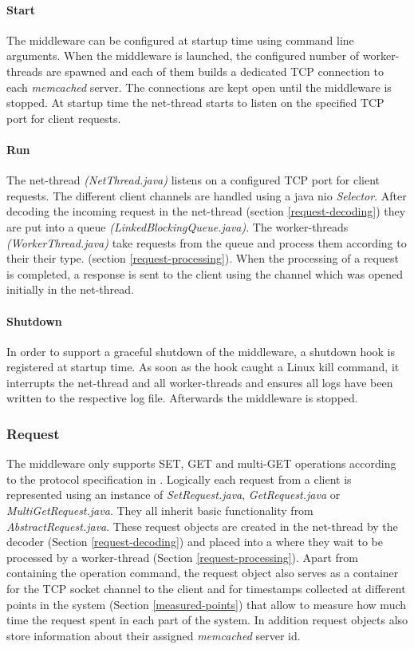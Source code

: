 \documentclass[report.tex]{subfiles}
\begin{document}
\paragraph{Start}
The middleware can be configured at startup time using command line arguments. When the middleware is launched, the configured number of worker-threads are spawned and each of them builds a dedicated TCP connection to each \emph{memcached} server. The connections are kept open until the middleware is stopped. At startup time the net-thread starts to listen on the specified TCP port for client requests.


\paragraph{Run}
The net-thread \emph{(NetThread.java)} listens on a configured TCP port for client requests. The different client channels are handled using a java nio \emph{Selector}.
After decoding the incoming request in the net-thread (section \ref{request-decoding}) they are put into a queue \emph{(LinkedBlockingQueue.java)}.
The worker-threads \emph{(WorkerThread.java)} take requests from the queue and process them according to their their type. (section  \ref{request-processing}). When the processing of a request is completed, a response is sent to the client using the channel which was opened initially in the net-thread.


\paragraph{Shutdown}
In order to support a graceful shutdown of the middleware, a shutdown hook is registered at startup time. As soon as the hook caught a Linux kill command, it interrupts the net-thread and all worker-threads and ensures all logs have been written to the respective log file. Afterwards the middleware is stopped.

\subsubsection{Request}
The middleware only supports SET, GET and multi-GET operations according to the protocol specification in \cite{memcached:protocol}.
Logically each request from a client is represented using an instance of \emph{SetRequest.java}, \emph{GetRequest.java} or \emph{MultiGetRequest.java}. They all inherit basic functionality from \emph{AbstractRequest.java}.
These request objects are created in the net-thread by the decoder (Section \ref{request-decoding}) and placed into a where they wait to be processed by a worker-thread (Section \ref{request-processing}).
Apart from containing the operation command, the request object also serves as a container for the TCP socket channel to the client and for timestamps collected at different points in the system (Section \ref{measured-points}) that allow to measure how much time the request spent in each part of the system.
In addition request objects also store information about their assigned \emph{memcached} server id.
\end{document}
